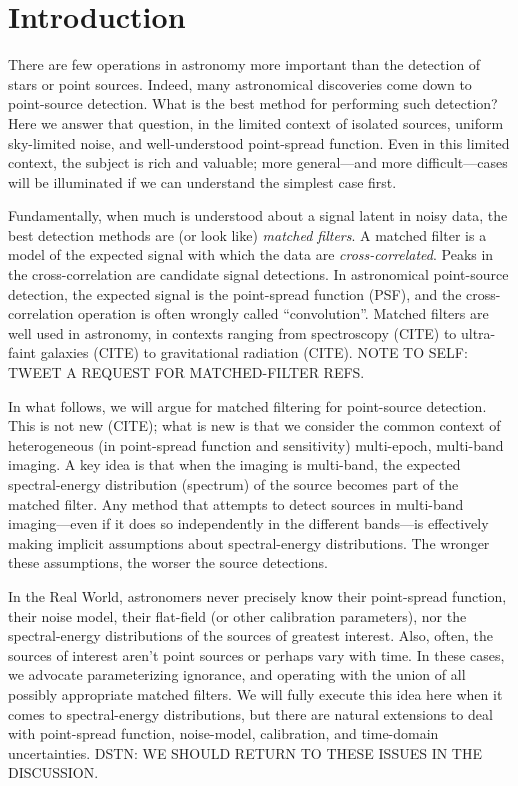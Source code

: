 \documentclass[letterpaper,preprint]{aastex}
\begin{document}

\section{Introduction}

There are few operations in astronomy more important than the
detection of stars or point sources.
Indeed, many astronomical discoveries come down to point-source
detection.
What is the best method for performing such detection?
Here we answer that question, in the limited context of isolated
sources, uniform sky-limited noise, and well-understood point-spread
function.
Even in this limited context, the subject is rich and valuable; more
general---and more difficult---cases will be illuminated if we can
understand the simplest case first.

Fundamentally, when much is understood about a signal latent in noisy
data, the best detection methods are (or look like) \emph{matched
filters}.
A matched filter is a model of the expected signal with which the data
are \emph{cross-correlated}.%
Peaks in the cross-correlation are candidate signal detections.
In astronomical point-source detection, the expected signal is the
point-spread function (PSF), and the cross-correlation operation is often
wrongly called ``convolution''.
Matched filters are well used in astronomy, in contexts ranging from
spectroscopy (CITE) to ultra-faint galaxies (CITE) to gravitational
radiation (CITE).
NOTE TO SELF: TWEET A REQUEST FOR MATCHED-FILTER REFS.

In what follows, we will argue for matched filtering for point-source
detection.
This is not new (CITE); what is new is that we consider the common
context of heterogeneous (in point-spread function and sensitivity)
multi-epoch, multi-band imaging.
A key idea is that when the imaging is multi-band, the expected
spectral-energy distribution (spectrum) of the source becomes part of
the matched filter.
Any method that attempts to detect sources in multi-band
imaging---even if it does so independently in the different bands---is
effectively making implicit assumptions about spectral-energy
distributions.
The wronger these assumptions, the worser the source detections.

In the Real World, astronomers never precisely know their point-spread
function, their noise model, their flat-field (or other calibration
parameters), nor the spectral-energy distributions of the sources of
greatest interest.
Also, often, the sources of interest aren't point sources or perhaps
vary with time.
In these cases, we advocate parameterizing ignorance, and operating
with the union of all possibly appropriate matched filters.
We will fully execute this idea here when it comes to spectral-energy
distributions, but there are natural extensions to deal with
point-spread function, noise-model, calibration, and time-domain
uncertainties.
DSTN: WE SHOULD RETURN TO THESE ISSUES IN THE DISCUSSION.
\end{document}
